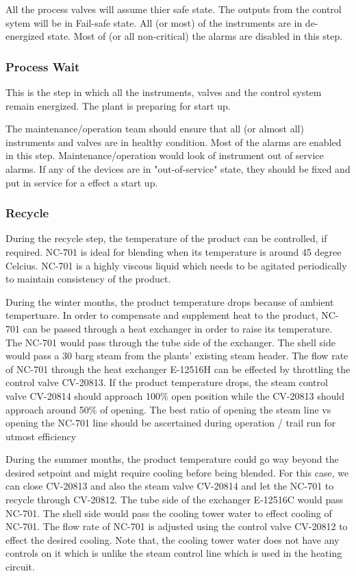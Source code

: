 \documentclass[a4paper,oneside]{article}
\begin{document}
All the process valves will assume thier safe state. The
outputs from the control sytem will be in Fail-safe state. All (or
most) of the instruments are in de-energized state. Most of (or all
non-critical) the alarms are disabled in this step.
\subsubsection{Process Wait}
\label{sec:orge884d51}
This is the step in which all the instruments, valves and the control
system remain energized. The plant is preparing for start up. 

The maintenance/operation team should ensure that all (or almost all)
instruments and valves are in healthy condition. Most of the alarms
are enabled in this step. Maintenance/operation would look of
instrument out of service alarms. If any of the devices are in
"out-of-service" state, they should be fixed and put in service for a
effect a start up.
\subsubsection{Recycle}
\label{sec:orgb3153de}
During the recycle step, the temperature of the product can be
controlled, if required. NC-701 is ideal for blending when its
temperature is around 45 degree Celcius. NC-701 is a highly viscous
liquid which needs to be agitated periodically to maintain consistency
of the product.

During the winter months, the product temperature drops because of
ambient tempertuare. In order to compensate and supplement heat to the
product, NC-701 can be passed through a heat exchanger in order to
raise its temperature. The NC-701 would pass through the tube side of
the exchanger. The shell side would pass a 30 barg steam from the
plants' existing steam header. The flow rate of NC-701 through the
heat exchanger E-12516H can be effected by throttling the control
valve CV-20813. If the product temperature drops, the steam control
valve CV-20814 should approach 100\% open position while the CV-20813
should approach around 50\% of opening. The best ratio of opening the
steam line vs opening the NC-701 line should be ascertained during
operation / trail run for utmost efficiency

During the summer months, the product temperature could go way beyond
the desired setpoint and might require cooling before being
blended. For this case, we can close CV-20813 and also the steam valve
CV-20814 and let the NC-701 to recycle through CV-20812. The tube side
of the exchanger E-12516C would pass NC-701. The shell side would pass
the cooling tower water to effect cooling of NC-701. The flow rate of
NC-701 is adjusted using the control valve CV-20812 to effect the
desired cooling. Note that, the cooling tower water does not have any
controls on it which is unlike the steam control line which is used in
the heating circuit.
\end{document}
